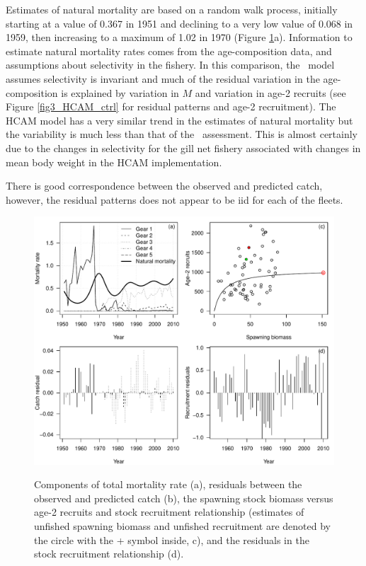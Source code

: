 Estimates of natural mortality are based on a random walk process, initially starting at a value of 0.367 in 1951 and declining to a very low value of 0.068 in 1959, then increasing to a maximum of 1.02 in 1970 (Figure \ref{fig2_HCAM_ctrl}a).  Information to estimate natural mortality rates comes from the age-composition data, and assumptions about selectivity in the fishery.  In this comparison, the \iscam\ model assumes selectivity is invariant and much of the residual variation in the age-composition is explained by variation in $M$ and variation in age-2 recruits (see Figure \ref{fig3_HCAM_ctrl} for residual patterns and age-2 recruitment).  The HCAM model has a very similar trend in the estimates of natural mortality but the variability is much less than that of the \iscam\ assessment.  This is almost certainly due to the changes in selectivity for the gill net fishery associated with changes in mean body weight in the HCAM implementation.

There is good correspondence between the observed and predicted catch, however, the residual patterns does not appear to be iid for each of the fleets.  

 

\begin{figure}[!tbp]
	\includegraphics[width=\textwidth]{../Figs/fig2_HCAM_ctrl.pdf}\\
	\caption{Components of total mortality rate (a), residuals between the observed and predicted catch (b), the spawning stock biomass versus age-2 recruits and stock recruitment relationship (estimates of unfished spawning biomass and unfished recruitment are denoted by the circle with the + symbol inside, c), and the residuals in the stock recruitment relationship (d). }\label{fig2_HCAM_ctrl}
\end{figure}

